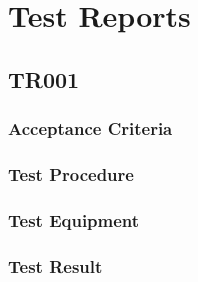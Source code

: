 \section{Test Reports}
\subsection{TR001}
\subsubsection{Acceptance Criteria}
\subsubsection{Test Procedure}

\subsubsection{Test Equipment}

\subsubsection{Test Result}

